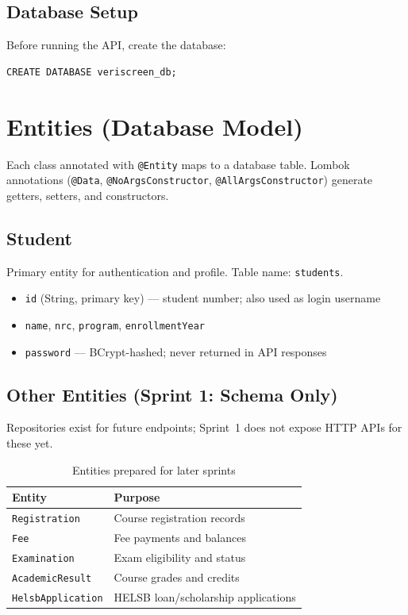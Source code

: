 \documentclass[11pt,a4paper]{article}
\begin{document}
\subsection{Database Setup}

Before running the API, create the database:

\begin{lstlisting}[style=properties, caption={PostgreSQL}]
CREATE DATABASE veriscreen_db;
\end{lstlisting}

\section{Entities (Database Model)}

Each class annotated with \texttt{@Entity} maps to a database table. Lombok annotations (\texttt{@Data}, \texttt{@NoArgsConstructor}, \texttt{@AllArgsConstructor}) generate getters, setters, and constructors.

\subsection{Student}

Primary entity for authentication and profile. Table name: \texttt{students}.

\begin{itemize}[noitemsep]
    \item \texttt{id} (String, primary key) --- student number; also used as login username
    \item \texttt{name}, \texttt{nrc}, \texttt{program}, \texttt{enrollmentYear}
    \item \texttt{password} --- BCrypt-hashed; never returned in API responses
\end{itemize}

\subsection{Other Entities (Sprint 1: Schema Only)}

Repositories exist for future endpoints; Sprint~1 does not expose HTTP APIs for these yet.

\begin{table}[h]
\centering
\small
\begin{tabular}{@{}ll@{}}
\toprule
\textbf{Entity} & \textbf{Purpose} \\
\midrule
\texttt{Registration}     & Course registration records \\
\texttt{Fee}              & Fee payments and balances \\
\texttt{Examination}      & Exam eligibility and status \\
\texttt{AcademicResult}   & Course grades and credits \\
\texttt{HelsbApplication} & HELSB loan/scholarship applications \\
\bottomrule
\end{tabular}
\caption{Entities prepared for later sprints}
\end{table}
\end{document}
